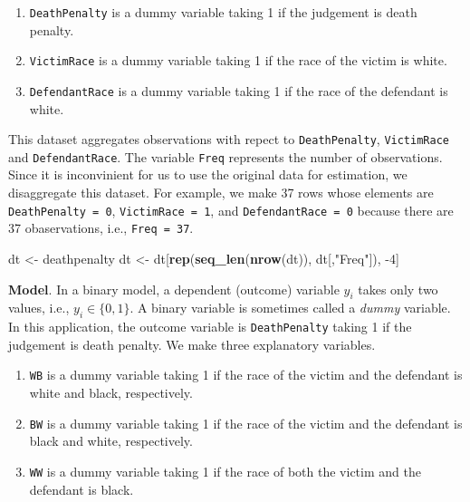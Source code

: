 \documentclass[
  12pt,
]{article}
\newenvironment{Shaded}{\begin{snugshade}}{\end{snugshade}}
\newcommand{\DecValTok}[1]{\textcolor[rgb]{0.00,0.00,0.81}{#1}}
\newcommand{\KeywordTok}[1]{\textcolor[rgb]{0.13,0.29,0.53}{\textbf{#1}}}
\newcommand{\NormalTok}[1]{#1}
\newcommand{\StringTok}[1]{\textcolor[rgb]{0.31,0.60,0.02}{#1}}
\providecommand{\tightlist}{%
  \setlength{\itemsep}{0pt}\setlength{\parskip}{0pt}}
\begin{document}
\begin{enumerate}
\def\labelenumi{\arabic{enumi}.}
\tightlist
\item
  \texttt{DeathPenalty} is a dummy variable taking 1 if the judgement is
  death penalty.
\item
  \texttt{VictimRace} is a dummy variable taking 1 if the race of the
  victim is white.
\item
  \texttt{DefendantRace} is a dummy variable taking 1 if the race of the
  defendant is white.
\end{enumerate}

This dataset aggregates observations with repect to
\texttt{DeathPenalty}, \texttt{VictimRace} and \texttt{DefendantRace}.
The variable \texttt{Freq} represents the number of observations. Since
it is inconvinient for us to use the original data for estimation, we
disaggregate this dataset. For example, we make 37 rows whose elements
are \texttt{DeathPenalty\ =\ 0}, \texttt{VictimRace\ =\ 1}, and
\texttt{DefendantRace\ =\ 0} because there are 37 obaservations, i.e.,
\texttt{Freq\ =\ 37}.

\begin{Shaded}
\begin{Highlighting}[]
\NormalTok{dt \textless{}{-}}\StringTok{ }\NormalTok{deathpenalty}
\NormalTok{dt \textless{}{-}}\StringTok{ }\NormalTok{dt[}\KeywordTok{rep}\NormalTok{(}\KeywordTok{seq\_len}\NormalTok{(}\KeywordTok{nrow}\NormalTok{(dt)), dt[,}\StringTok{"Freq"}\NormalTok{]), }\DecValTok{{-}4}\NormalTok{]}
\end{Highlighting}
\end{Shaded}

\noindent \textbf{Model}. In a binary model, a dependent (outcome)
variable \(y_i\) takes only two values, i.e., \(y_i \in \{0, 1\}\). A
binary variable is sometimes called a \emph{dummy} variable. In this
application, the outcome variable is \texttt{DeathPenalty} taking 1 if
the judgement is death penalty. We make three explanatory variables.

\begin{enumerate}
\def\labelenumi{\arabic{enumi}.}
\tightlist
\item
  \texttt{WB} is a dummy variable taking 1 if the race of the victim and
  the defendant is white and black, respectively.
\item
  \texttt{BW} is a dummy variable taking 1 if the race of the victim and
  the defendant is black and white, respectively.
\item
  \texttt{WW} is a dummy variable taking 1 if the race of both the
  victim and the defendant is black.
\end{enumerate}
\end{document}
